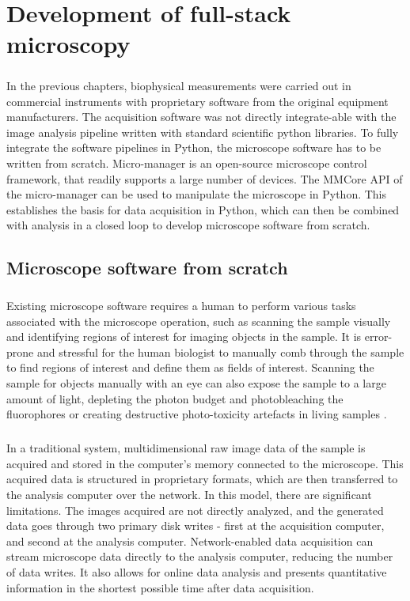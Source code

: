 \chapter{Development of full-stack microscopy}
\color{red}
\paragraph*{}In the previous chapters, biophysical measurements were carried out in commercial instruments with proprietary software from the original equipment manufacturers. The acquisition software was not directly integrate-able with the image analysis pipeline written with standard scientific python libraries. To fully integrate the software pipelines in Python, the microscope software has to be written from scratch. Micro-manager is an open-source microscope control framework, that readily supports a large number of devices. The MMCore API of the micro-manager can be used to manipulate the microscope in Python. This establishes the basis for data acquisition in Python, which can then be combined with analysis in a closed loop to develop microscope software from scratch.


\section{Microscope software from scratch}
\paragraph*{} Existing microscope software requires a human to perform various tasks associated with the microscope operation, such as scanning the sample visually and identifying regions of interest for imaging objects in the sample. It is error-prone and stressful for the human biologist to manually comb through the sample to find regions of interest and define them as fields of interest. Scanning the sample for objects manually with an eye can also expose the sample to a large amount of light, depleting the photon budget and photobleaching the fluorophores or creating destructive photo-toxicity artefacts in living samples \cite{scherf2015smart}. 

\paragraph*{}In a traditional system, multidimensional raw image data of the sample is acquired and stored in the computer's memory connected to the microscope. This acquired data is structured in proprietary formats, which are then transferred to the analysis computer over the network. In this model, there are significant limitations. The images acquired are not directly analyzed, and the generated data goes through two primary disk writes  - first at the acquisition computer, and second at the analysis computer. Network-enabled data acquisition can stream microscope data directly to the analysis computer, reducing the number of data writes. It also allows for online data analysis and presents quantitative information in the shortest possible time after data acquisition.

